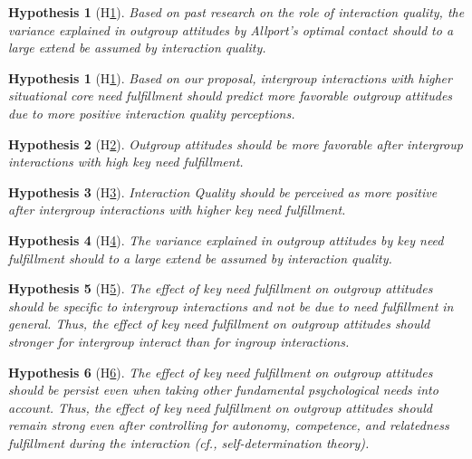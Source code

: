\documentclass[man, 12pt, a4paper, mask]{apa7}
\theoremstyle{break}
\theoremstyle{plain}
\newtheorem{hyp}{Hypothesis}
\newtheorem{subhyp}{Hypothesis}
\begin{document}
\begin{subhyp}[H\ref{hyp:AllportsQualityMediation}] \label{hyp:AllportsQualityMediation}
\addtolength{\leftskip}{2.5em}
Based on past research on the role of interaction quality, the variance explained in outgroup attitudes by Allport's optimal contact should to a large extend be assumed by interaction quality.
\end{subhyp}

\begin{hyp}[H\ref{hyp:keyNeed}] \label{hyp:keyNeed}
Based on our proposal, intergroup interactions with higher situational core need fulfillment should predict more favorable outgroup attitudes due to more positive interaction quality perceptions.
\end{hyp}

\setcounter{subhyp}{0}
\begin{subhyp}[H\ref{hyp:keyNeedPred}] \label{hyp:keyNeedPred}
\addtolength{\leftskip}{2.5em}
Outgroup attitudes should be more favorable after intergroup interactions with high key need fulfillment.
\end{subhyp}

\begin{subhyp}[H\ref{hyp:keyNeedQual}] \label{hyp:keyNeedQual}
\addtolength{\leftskip}{2.5em}
Interaction Quality should be perceived as more positive after intergroup interactions with higher key need fulfillment.
\end{subhyp}

\begin{subhyp}[H\ref{hyp:keyNeedMediation}] \label{hyp:keyNeedMediation}
\addtolength{\leftskip}{2.5em}
The variance explained in outgroup attitudes by key need fulfillment should to a large extend be assumed by interaction quality.
\end{subhyp}

\begin{subhyp}[H\ref{hyp:keyNeedContactType}] \label{hyp:keyNeedContactType}
\addtolength{\leftskip}{2.5em}
The effect of key need fulfillment on outgroup attitudes should be specific to intergroup interactions and not be due to need fulfillment in general. Thus, the effect of key need fulfillment on outgroup attitudes should stronger for intergroup interact than for ingroup interactions. 
\end{subhyp}

\begin{subhyp}[H\ref{hyp:keyNeedSDT}] \label{hyp:keyNeedSDT}
\addtolength{\leftskip}{2.5em}
The effect of key need fulfillment on outgroup attitudes should be persist even when taking other fundamental psychological needs into account. Thus, the effect of key need fulfillment on outgroup attitudes should remain strong even after controlling for autonomy, competence, and relatedness fulfillment during the interaction (cf., self-determination theory). 
\end{subhyp}
\end{document}
